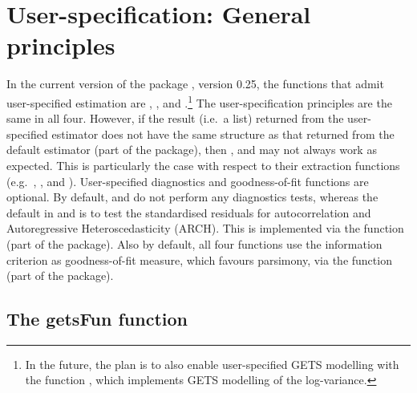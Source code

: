 \section{User-specification: General principles} 

In the current version of the package , version 0.25, the functions that admit user-specified estimation are , ,  and .\footnote{In the future, the plan is to also enable user-specified GETS modelling with the function , which implements GETS modelling of the log-variance.} The user-specification principles are the same in all four. However, if the result (i.e.\ a list) returned from the user-specified estimator does not have the same structure as that returned from the default estimator  (part of the  package), then ,  and  may not always work as expected. This is particularly the case with respect to their extraction functions (e.g.\ , ,  and ). User-specified diagnostics and goodness-of-fit functions are optional. By default,  and  do not perform any diagnostics tests, whereas the default in  and  is to test the standardised residuals for autocorrelation and Autoregressive Heteroscedasticity (ARCH). This is implemented via the  function (part of the  package). Also by default, all four functions use the \cite{Schwarz1978} information criterion as goodness-of-fit measure, which favours parsimony, via the  function (part of the  package).

\subsection{The getsFun function}

